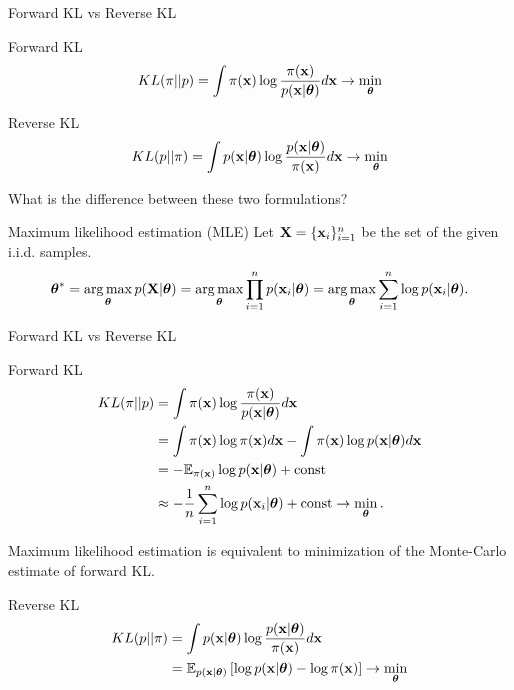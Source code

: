 \begin{frame}{Forward KL vs Reverse KL}
	\begin{block}{Forward KL}
		\vspace{-0.2cm}
		\[
		KL(\pi || p) = \int \pi (\mathbf{x}) \log \frac{\pi(\mathbf{x})}{p(\mathbf{x} | \boldsymbol{\theta})} d \mathbf{x} \rightarrow \min_{\boldsymbol{\theta}}
		\]
	\end{block}
	\begin{block}{Reverse KL}
		\vspace{-0.2cm}
		\[
		KL(p || \pi) = \int p (\mathbf{x}| \boldsymbol{\theta}) \log \frac{p(\mathbf{x}| \boldsymbol{\theta})}{\pi(\mathbf{x})} d \mathbf{x} \rightarrow \min_{\boldsymbol{\theta}}
		\]
	\end{block}
	What is the difference between these two formulations?
	
	\begin{block}{Maximum likelihood estimation (MLE)}
	Let $\mathbf{X} = \{\mathbf{x}_i\}_{i=1}^n$ be the set of the given i.i.d. samples.
		\vspace{-0.5cm}
		\[
		\boldsymbol{\theta}^* = \operatorname*{arg\,max}_{\boldsymbol{\theta}} p(\mathbf{X} | \boldsymbol{\theta}) = \operatorname*{arg\,max}_{\boldsymbol{\theta}} \prod_{i=1}^n p(\mathbf{x}_i | \boldsymbol{\theta}) = \operatorname*{arg\,max}_{\boldsymbol{\theta}} \sum_{i=1}^n \log p(\mathbf{x}_i | \boldsymbol{\theta}).
		\]
		\vspace{-0.1cm}
	\end{block}
\end{frame}
\begin{frame}{Forward KL vs Reverse KL}
	\begin{block}{Forward KL}
		\vspace{-0.5cm}
		\begin{align*}
			KL(\pi || p) &= \int \pi (\mathbf{x}) \log \frac{\pi(\mathbf{x})}{p(\mathbf{x} | \boldsymbol{\theta})} d \mathbf{x} \\
			&= \int \pi (\mathbf{x}) \log \pi(\mathbf{x}) d \mathbf{x} - \int \pi (\mathbf{x}) \log p(\mathbf{x} | \boldsymbol{\theta}) d \mathbf{x} \\
			&= - \mathbb{E}_{\pi(\mathbf{x})} \log p(\mathbf{x} | \boldsymbol{\theta}) + \text{const} \\
			& \approx - \frac{1}{n} \sum_{i=1}^n \log p(\mathbf{x}_i | \boldsymbol{\theta}) + \text{const} \rightarrow \min_{\boldsymbol{\theta}}.
		\end{align*}
		\vspace{-0.5cm}
	\end{block}
	Maximum likelihood estimation is equivalent to minimization of the Monte-Carlo estimate of forward KL.
	\begin{block}{Reverse KL}
		\vspace{-0.5cm}
		\begin{align*}
			KL(p || \pi) &= \int p(\mathbf{x} | \boldsymbol{\theta}) \log \frac{p(\mathbf{x} | \boldsymbol{\theta})}{\pi(\mathbf{x})} d \mathbf{x} \\
			&= \mathbb{E}_{p(\mathbf{x} | \boldsymbol{\theta})} \left[\log p(\mathbf{x} | \boldsymbol{\theta}) - \log \pi(\mathbf{x})\right] \rightarrow \min_{\boldsymbol{\theta}}
		\end{align*}
		\vspace{-0.7cm}
	\end{block}
\end{frame}
